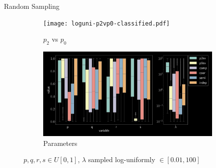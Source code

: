 \documentclass[aspectratio=169,9pt]{beamer}
\begin{document}
\begin{frame}{Random Sampling}
  \begin{figure}[h]
      \begin{adjustwidth}{-5cm}{-5cm}
        \centering
        \begin{subfigure}[b]{0.33\textwidth}
          \centering
          \texttt{[image: loguni-p2vp0-classified.pdf]}
          \caption{$p_2$ vs $p_0$}
        \end{subfigure}\pause
        \begin{subfigure}[b]{0.66\textwidth}
          \centering
          \includegraphics[width=\textwidth]{loguni-parms.pdf}
          \caption{Parameters}
        \end{subfigure}
      \end{adjustwidth}
      \pause[-1]\caption{ $p,q,r,s \in U[0,1]$, $\lambda$ sampled log-uniformly $\in [0.01,100]$}
    \end{figure}
\end{frame}
\end{document}
